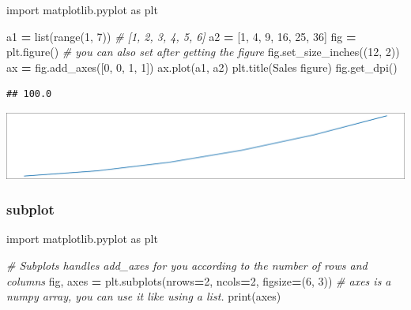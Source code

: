 \documentclass[
]{book}
\newenvironment{Shaded}{\begin{snugshade}}{\end{snugshade}}
\newcommand{\BuiltInTok}[1]{#1}
\newcommand{\CommentTok}[1]{\textcolor[rgb]{0.56,0.35,0.01}{\textit{#1}}}
\newcommand{\DecValTok}[1]{\textcolor[rgb]{0.00,0.00,0.81}{#1}}
\newcommand{\ImportTok}[1]{#1}
\newcommand{\NormalTok}[1]{#1}
\newcommand{\OperatorTok}[1]{\textcolor[rgb]{0.81,0.36,0.00}{\textbf{#1}}}
\newcommand{\StringTok}[1]{\textcolor[rgb]{0.31,0.60,0.02}{#1}}
\theoremstyle{definition}
\theoremstyle{definition}
\theoremstyle{definition}
\theoremstyle{definition}
\theoremstyle{remark}
\begin{document}
\begin{Shaded}
\begin{Highlighting}[]
\ImportTok{import}\NormalTok{ matplotlib.pyplot }\ImportTok{as}\NormalTok{ plt}

\NormalTok{a1 }\OperatorTok{=} \BuiltInTok{list}\NormalTok{(}\BuiltInTok{range}\NormalTok{(}\DecValTok{1}\NormalTok{, }\DecValTok{7}\NormalTok{)) }\CommentTok{\# [1, 2, 3, 4, 5, 6]}
\NormalTok{a2 }\OperatorTok{=}\NormalTok{ [}\DecValTok{1}\NormalTok{, }\DecValTok{4}\NormalTok{, }\DecValTok{9}\NormalTok{, }\DecValTok{16}\NormalTok{, }\DecValTok{25}\NormalTok{, }\DecValTok{36}\NormalTok{]}
\NormalTok{fig }\OperatorTok{=}\NormalTok{ plt.figure()}
\CommentTok{\# you can also set after getting the figure}
\NormalTok{fig.set\_size\_inches((}\DecValTok{12}\NormalTok{, }\DecValTok{2}\NormalTok{))}
\NormalTok{ax }\OperatorTok{=}\NormalTok{ fig.add\_axes([}\DecValTok{0}\NormalTok{, }\DecValTok{0}\NormalTok{, }\DecValTok{1}\NormalTok{, }\DecValTok{1}\NormalTok{])}
\NormalTok{ax.plot(a1, a2)}
\NormalTok{plt.title(}\StringTok{\textquotesingle{}Sales figure\textquotesingle{}}\NormalTok{)}
\NormalTok{fig.get\_dpi()}
\end{Highlighting}
\end{Shaded}

\begin{verbatim}
## 100.0
\end{verbatim}

\includegraphics{202403181222-MatPlotLib_files/figure-latex/unnamed-chunk-24-27.pdf}

\subsubsection{subplot}\label{subplot}

\begin{Shaded}
\begin{Highlighting}[]
\ImportTok{import}\NormalTok{ matplotlib.pyplot }\ImportTok{as}\NormalTok{ plt}

\CommentTok{\# Subplots handles add\_axes for you according to the number of rows and columns}
\NormalTok{fig, axes }\OperatorTok{=}\NormalTok{ plt.subplots(nrows}\OperatorTok{=}\DecValTok{2}\NormalTok{, ncols}\OperatorTok{=}\DecValTok{2}\NormalTok{, figsize}\OperatorTok{=}\NormalTok{(}\DecValTok{6}\NormalTok{, }\DecValTok{3}\NormalTok{))}
\CommentTok{\# axes is a numpy array, you can use it like using a list.}
\BuiltInTok{print}\NormalTok{(axes)}
\end{Highlighting}
\end{Shaded}
\end{document}
